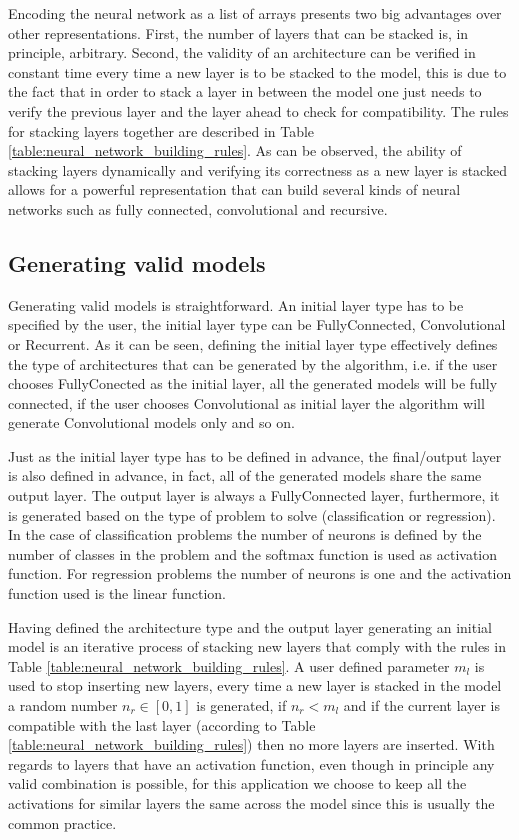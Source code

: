 \documentclass[journal]{IEEEtran}
\begin{document}
Encoding the neural network as a list of arrays presents two big advantages over other representations. First, the number of layers that can be stacked is, in principle, arbitrary. Second, the validity of an architecture can be verified in constant time every time a new layer is to be stacked to the model, this is due to the fact that in order to stack a layer in between the model one just needs to verify the previous layer and the layer ahead to check for compatibility. The rules for stacking layers together are described in Table \ref{table:neural_network_building_rules}. As can be observed, the ability of stacking layers dynamically and verifying its correctness as a new layer is stacked allows for a powerful representation that can build several kinds of neural networks such as fully connected, convolutional and recursive.

\subsection{Generating valid models}
\label{sec:valid_models}

Generating valid models is straightforward. An initial layer type has to be specified by the user, the initial layer type can be FullyConnected, Convolutional or Recurrent. As it can be seen, defining the initial layer type effectively defines the type of architectures that can be generated by the algorithm, i.e. if the user chooses FullyConected as the initial layer, all the generated models will be fully connected, if the user chooses Convolutional as initial layer the algorithm will generate Convolutional models only and so on.

Just as the initial layer type has to be defined in advance, the final/output layer is also defined in advance, in fact, all of the generated models share the same output layer. The output layer is always a FullyConnected layer, furthermore, it is generated based on the type of problem to solve (classification or regression). In the case of classification problems the number of neurons is defined by the number of classes in the problem and the softmax function is used as activation function. For regression problems the number of neurons is one and the activation function used is the linear function.

Having defined the architecture type and the output layer generating an initial model is an iterative process of stacking new layers that comply with the rules in Table \ref{table:neural_network_building_rules}. A user defined parameter $m_l$ is used to stop inserting new layers, every time a new layer is stacked in the model a random number $n_r \in \left[0,1\right]$ is generated, if $n_r < m_l$ and if the current layer is compatible with the last layer (according to Table \ref{table:neural_network_building_rules}) then no more layers are inserted. With regards to layers that have an activation function, even though in principle any valid combination is possible, for this application we choose to keep all the activations for similar layers the same across the model since this is usually the common practice. 
\end{document}
